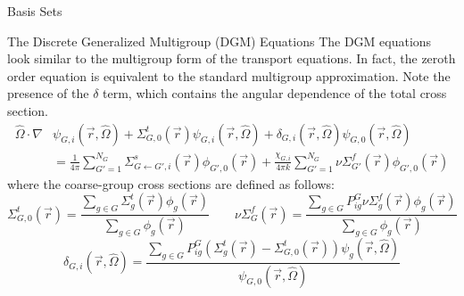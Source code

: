 \documentclass[final]{beamer}
\begin{document}
\begin{frame}{}
\begin{columns}[t]
\begin{column}{.32\linewidth}
\begin{block}{Basis Sets}
\begin{figure}[htb]
                \end{figure}
            \end{block}
            \begin{block}{The Discrete Generalized Multigroup (DGM) Equations}
                The DGM equations look similar to the multigroup form of the transport equations.
                In fact, the zeroth order equation is equivalent to the standard multigroup approximation.
                Note the presence of the $\delta$ term, which contains the angular dependence of the total cross section.
                \begin{equation*}
                    \begin{split}
                        \hat{\Omega} \cdot \nabla & \psi_{G,i}(\vec{r},\hat{\Omega}) 
                        + \Sigma^t_{G,0}(\vec{r}) \psi_{G,i}(\vec{r},\hat{\Omega})
                        + \delta_{G,i}(\vec{r}, \hat{\Omega}) \psi_{G,0}(\vec{r},\hat{\Omega}) \\
                        &= \frac{1}{4\pi} \sum^{N_G}_{G'=1} \Sigma^s_{G\leftarrow G',i}(\vec{r}) \phi_{G',0}(\vec{r})
                        + \frac{\chi_{G,i}}{4\pi k} \sum^{N_G}_{G'=1} \nu\Sigma^f_{G'}(\vec{r}) \phi_{G',0}(\vec{r})
                    \end{split}
                \end{equation*}
                where the coarse-group cross sections are defined as follows:
                \begin{equation*}
                    \Sigma^t_{G,0}(\vec{r}) 
                    = \frac{\sum\limits_{g\in G} \Sigma^t_{g}(\vec{r}) \phi_g(\vec{r})} 
                        {\sum\limits_{g\in G} \phi_g(\vec{r}) }
                    \quad\text{}\quad
                    \nu\Sigma^f_{G}(\vec{r}) 
                    = \frac{\sum\limits_{g\in G} P^G_{ig} \nu\Sigma^f_{g}(\vec{r}) \phi_{g}(\vec{r}) }
                        {\sum\limits_{g\in G} \phi_g(\vec{r}) }
                \end{equation*} 
                \begin{equation*}
                    \delta_{G,i}(\vec{r}, \hat{\Omega}) 
                    = \frac{\sum\limits_{g\in G} P^G_{ig} \left(\Sigma^t_{g}(\vec{r}) - \Sigma^t_{G,0}(\vec{r}) \right) \psi_g(\vec{r},\hat{\Omega})}
                        {\psi_{G,0}(\vec{r}, \hat{\Omega})}
                \end{equation*}
                \begin{equation*}

\end{equation*}
\end{block}
\end{column}
\end{columns}
\end{frame}
\end{document}
